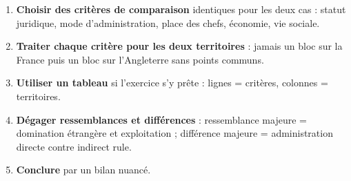 \documentclass[11pt]{article}
\begin{document}
\begin{methode}
\begin{enumerate}
\item \textbf{Choisir des critères de comparaison} identiques pour les deux cas : statut juridique, mode d'administration, place des chefs, économie, vie sociale.
\item \textbf{Traiter chaque critère pour les deux territoires} : jamais un bloc sur la France puis un bloc sur l'Angleterre sans points communs.
\item \textbf{Utiliser un tableau} si l'exercice s'y prête : lignes = critères, colonnes = territoires.
\item \textbf{Dégager ressemblances et différences} : ressemblance majeure = domination étrangère et exploitation ; différence majeure = administration directe contre indirect rule.
\item \textbf{Conclure} par un bilan nuancé.
\end{enumerate}
\end{methode}
\end{document}
